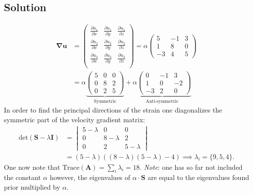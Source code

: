 \documentclass{article}
\newcommand{\grad}{\mathbf{\nabla}}
\begin{document}
\subsection*{Solution}
\begin{align*}
    \grad{\mathbf{u}} &= \begin{pmatrix}
        \frac{\partial u_1}{\partial x} & \frac{\partial u_1}{\partial y} & \frac{\partial u_1}{\partial z}\\
        \frac{\partial u_2}{\partial x} & \frac{\partial u_2}{\partial y} & \frac{\partial u_2}{\partial z}\\
        \frac{\partial u_3}{\partial x} & \frac{\partial u_3}{\partial y} & \frac{\partial u_3}{\partial z}\\
    \end{pmatrix} = \alpha\begin{pmatrix}
        5 & -1 & 3\\
        1 & 8 & 0\\
        -3 & 4 & 5
    \end{pmatrix}\\
    &=\alpha\underbrace{\begin{pmatrix}
        5&0&0\\
        0&8&2\\
        0&2&5
    \end{pmatrix}}_{\text{Symmetric}} + \underbrace{\alpha\begin{pmatrix}
        0&-1&3\\
        1&0&-2\\
        -3&2&0
    \end{pmatrix}}_{\text{Anti-symmetric}}
\end{align*}In order to find the principal directions of the strain one diagonalizes the symmetric part of the velocity gradient matrix:
\begin{align*}
    \text{det}\left(\mathbf{S} - \lambda\mathbf{I}\right)&=\begin{vmatrix}
        5-\lambda&0&0\\
        0&8-\lambda&2\\
        0&2&5-\lambda
    \end{vmatrix}\\
    &= (5-\lambda)\left((8-\lambda)(5-\lambda) - 4\right)\implies \lambda_i = \{9, 5, 4\}.
\end{align*}One now note that $\text{Trace}(\mathbf{A}) = \sum_i\lambda_i = 18$. \textit{Note}: one has so far not included the constant $\alpha$ however, the eigenvalues of $\alpha\cdot\mathbf{S}$ are equal to the eigenvalues found prior multiplied by $\alpha$.
\end{document}
